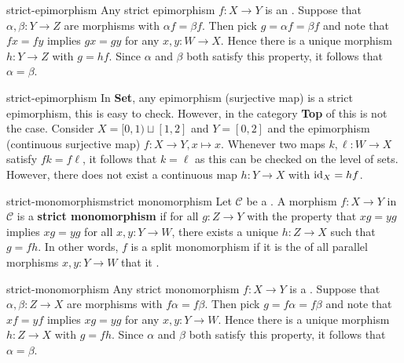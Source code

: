 \begin{example}{strict-epimorphism}
    Any strict epimorphism $f : X \to Y$ is an . Suppose that $\alpha, \beta : Y \to Z$ are morphisms with $\alpha f = \beta f$. Then pick $g = \alpha f = \beta f$ and note that $fx = fy$ implies $gx = gy$ for any $x, y : W \to X$. Hence there is a unique morphism $h : Y \to Z$ with $g = hf$. Since $\alpha$ and $\beta$ both satisfy this property, it follows that $\alpha = \beta$.
\end{example}

\begin{example}{strict-epimorphism}
    In \textbf{Set}, any epimorphism (surjective map) is a strict epimorphism, this is easy to check. However, in the category \textbf{Top} of  this is not the case. Consider $X = [0, 1) \sqcup [1, 2]$ and $Y = [0, 2]$ and the epimorphism (continuous surjective map) $f : X \to Y, x \mapsto x$. Whenever two maps $k, \ell : W \to X$ satisfy $fk = f\ell$, it follows that $k = \ell$ as this can be checked on the level of sets. However, there does not exist a continuous map $h : Y \to X$ with $\text{id}_X = hf$.
\end{example}

\begin{topic}{strict-monomorphism}{strict monomorphism}
    Let $\mathcal{C}$ be a . A morphism $f : X \to Y$ in $\mathcal{C}$ is a \textbf{strict monomorphism} if for all $g : Z \to Y$ with the property that $xg = yg$ implies $xg = yg$ for all $x, y : Y \to W$, there exists a unique $h : Z \to X$ such that $g = fh$. In other words, $f$ is a split monomorphism if it is the  of all parallel morphisms $x, y : Y \to W$ that it .
\end{topic}

\begin{example}{strict-monomorphism}
    Any strict monomorphism $f : X \to Y$ is a . Suppose that $\alpha, \beta : Z \to X$ are morphisms with $f \alpha = f \beta$. Then pick $g = f \alpha = f \beta$ and note that $xf = yf$ implies $xg = yg$ for any $x, y : Y \to W$. Hence there is a unique morphism $h : Z \to X$ with $g = fh$. Since $\alpha$ and $\beta$ both satisfy this property, it follows that $\alpha = \beta$.
\end{example}
